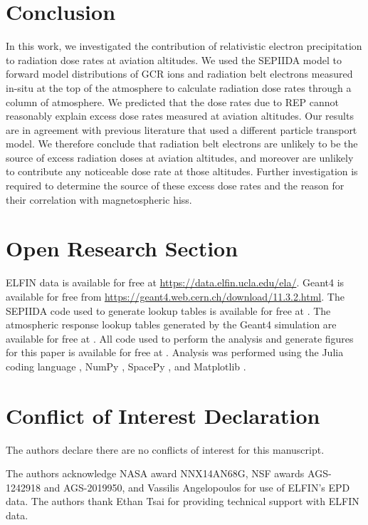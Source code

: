 \documentclass[draft]{agujournal2019}
\begin{document}
\section{Conclusion}
In this work, we investigated the contribution of relativistic electron precipitation to radiation dose rates at aviation altitudes. We used the SEPIIDA model to forward model distributions of GCR ions and radiation belt electrons measured in-situ at the top of the atmosphere to calculate radiation dose rates through a column of atmosphere. We predicted that the dose rates due to REP cannot reasonably explain excess dose rates measured at aviation altitudes. Our results are in agreement with previous literature that used a different particle transport model. We therefore conclude that radiation belt electrons are unlikely to be the source of excess radiation doses at aviation altitudes, and moreover are unlikely to contribute any noticeable dose rate at those altitudes. Further investigation is required to determine the source of these excess dose rates and the reason for their correlation with magnetospheric hiss.

\section*{Open Research Section}
ELFIN data \cite{angelopoulos2020} is available for free at \url{https://data.elfin.ucla.edu/ela/}. Geant4 \cite{geant4} is available for free from \url{https://geant4.web.cern.ch/download/11.3.2.html}. The SEPIIDA code used to generate lookup tables is available for free at . The atmospheric response lookup tables generated by the Geant4 simulation are available for free at . All code used to perform the analysis and generate figures for this paper is available for free at . Analysis was performed using the Julia coding language \cite{julia-language}, NumPy \cite{numpy}, SpacePy \cite{spacepy1, spacepy2}, and Matplotlib \cite{matplotlib}.

\section*{Conflict of Interest Declaration}
The authors declare there are no conflicts of interest for this manuscript.

\acknowledgments
The authors acknowledge NASA award NNX14AN68G, NSF awards AGS-1242918 and AGS-2019950, and Vassilis Angelopoulos for use of ELFIN's EPD data. The authors thank Ethan Tsai for providing technical support with ELFIN data.


\end{document}
